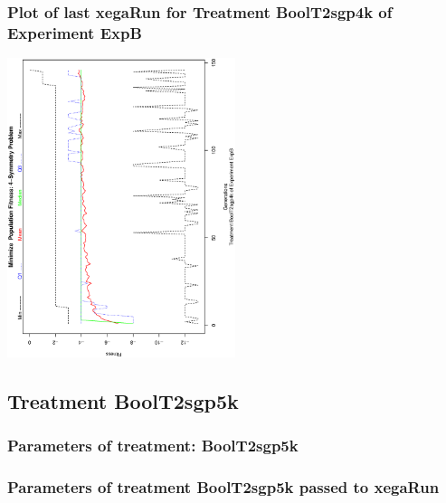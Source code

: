 \documentclass[18pt,c]{beamer}
\makeatletter
\def\beamer@writeslidentry@miniframesoff{%
  \expandafter\beamer@ifempty\expandafter{\beamer@framestartpage}{}%
  {%
   \clearpage\beamer@notesactions%
  }
}
\newcommand*{\miniframesoff}{\let\beamer@writeslidentry=\beamer@writeslidentry@miniframesoff}
\makeatother
\begin{document}
 \begin{frame}
 \frametitle{ Plot of last xegaRun for Treatment BoolT2sgp4k of Experiment ExpB }
 \begin{center}
\includegraphics[width=0.5\textwidth, angle=-90]
{ExpBPlotPopStatsFigure012.eps}
 \end{center}
 \label{report/ExpBPlotPopStatsFigure012.eps}  
 \end{frame}

\miniframesoff
\subsection{Treatment BoolT2sgp5k}

 \begin{frame}
 \fontsize{8pt}{9pt}\selectfont
 \frametitle{  Parameters of treatment: BoolT2sgp5k 
 }

 \label{ExpBtParmTable052.tex}  
 \end{frame}


 \begin{frame}
 \fontsize{8pt}{9pt}\selectfont
 \frametitle{  Parameters of treatment BoolT2sgp5k passed to xegaRun
 }

 \label{ExpBtParmTable053.tex}  
 \end{frame}
\end{document}
